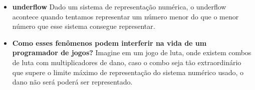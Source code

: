 \documentclass{abntex2}
\begin{document}
\begin{enumerate}
\begin{enumerate}
\begin{itemize}
        \item \textbf{underflow} \linebreak
        Dado um sistema de representação numérica, o underflow acontece quando tentamos representar um número menor do que o menor número que esse sistema consegue representar.
        \item \textbf{Como esses fenômenos podem interferir na vida de um programador de jogos?} \linebreak
        Imagine em um jogo de luta, onde existem combos de luta com multiplicadores de dano, caso o combo seja tão extraordinário que supere o limite máximo de representação do sistema numérico usado, o dano não será poderá ser representado.
      \end{itemize}
    \end{enumerate}
  \end{enumerate}
\end{document}
